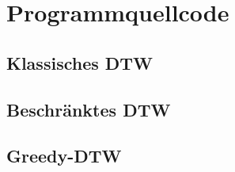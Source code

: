\chapter{Programmquellcode}

\TODO

\section{Klassisches DTW}



\section{Beschränktes DTW}



\section{Greedy-DTW}

